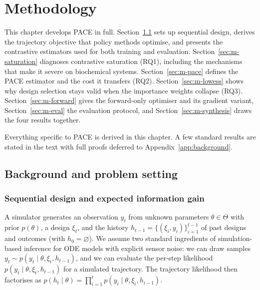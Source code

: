 \chapter{Methodology}
\label{sec:methodology}

This chapter develops PACE in full. Section~\ref{sec:m-prelim} sets up sequential
design, derives the trajectory objective that policy methods optimise, and presents
the contrastive estimators used for both training and evaluation.
Section~\ref{sec:m-saturation} diagnoses contrastive saturation (RQ1), including the
mechanisms that make it severe on biochemical systems. Section~\ref{sec:m-pace}
defines the PACE estimator and the cost it transfers (RQ2). Section~\ref{sec:m-lowess}
shows why design selection stays valid when the importance weights collapse (RQ3).
Section~\ref{sec:m-forward} gives the forward-only optimiser and its gradient
variant, Section~\ref{sec:m-eval} the evaluation protocol, and
Section~\ref{sec:m-synthesis} draws the four results together.

Everything specific to PACE is derived in this chapter. A few standard results are
stated in the text with full proofs deferred to Appendix~\ref{app:background}.

\section{Background and problem setting}
\label{sec:m-prelim}

\subsection{Sequential design and expected information gain}
\label{sec:m-bed}

A simulator generates an observation $y_t$ from unknown parameters
$\theta\in\Theta$ with prior $p(\theta)$, a design $\xi_t$, and the history
$h_{t-1}=\{(\xi_i,y_i)\}_{i=1}^{t-1}$ of past designs and outcomes (with
$h_0=\varnothing$). We assume two standard ingredients of simulation-based inference
for ODE models with explicit sensor noise: we can draw samples
$y_t\sim p(y_t\mid\theta,\xi_t,h_{t-1})$, and we can evaluate the per-step likelihood
$p(y_t\mid\theta,\xi_t,h_{t-1})$ for a simulated trajectory. The trajectory
likelihood then factorises as
$p(h_t\mid\theta)=\prod_{i=1}^{t}p(y_i\mid\theta,\xi_i,h_{i-1})$.

